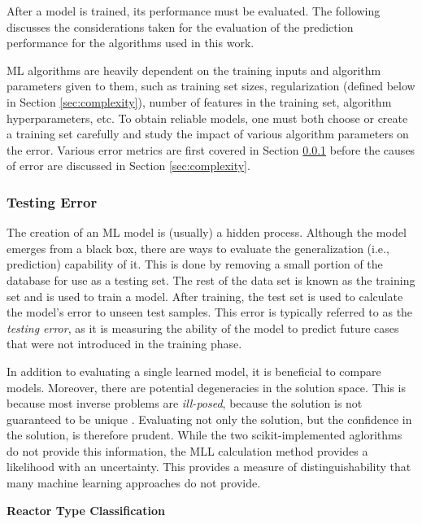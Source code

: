 After a model is trained, its performance must be evaluated. The following
discusses the considerations taken for the evaluation of the prediction
performance for the algorithms used in this work. 

\gls{ML} algorithms are heavily dependent on the training inputs and algorithm
parameters given to them, such as training set sizes, regularization (defined
below in Section \ref{sec:complexity}), number of features in the training set,
algorithm hyperparameters, etc.  To obtain reliable models, one must both
choose or create a training set carefully and study the impact of various
algorithm parameters on the error. Various error metrics are first covered in
Section \ref{sec:testerr} before the causes of error are discussed in Section
\ref{sec:complexity}.

\subsubsection{Testing Error}
\label{sec:testerr}

The creation of an \gls{ML} model is (usually) a hidden process. Although the
model emerges from a black box, there are ways to evaluate the generalization
(i.e., prediction) capability of it.  This is done by removing a small portion
of the database for use as a testing set.  The rest of the data set is known as
the training set and is used to train a model. After training, the test set is
used to calculate the model's error to unseen test samples.  This error
is typically referred to as the \textit{testing error}, as it is measuring the
ability of the model to predict future cases that were not introduced in the
training phase. 

In addition to evaluating a single learned model, it is beneficial to compare
models. Moreover, there are potential degeneracies in the solution space. This
is because most inverse problems are \textit{ill-posed}, because the solution
is not guaranteed to be unique \cite{skutnik_2016}.  Evaluating not only the
solution, but the confidence in the solution, is therefore prudent. While the
two scikit-implemented aglorithms do not provide this information, the
\gls{MLL} calculation method provides a likelihood with an uncertainty. This
provides a measure of distinguishability that many machine learning approaches
do not provide. 

\noindent \textbf{Reactor Type Classification}

